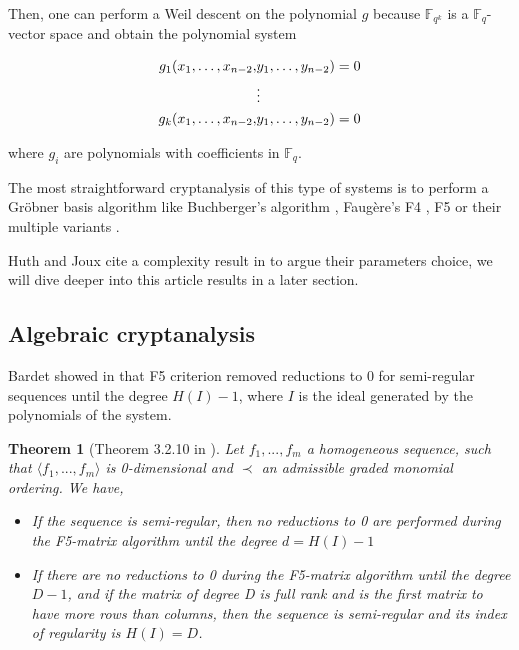 \documentclass[english]{article}
\newtheorem{theorem}{Theorem}[section]
\begin{document}
		Then, one can perform a Weil descent on the polynomial $g$ because $\mathbb{F}_{q^k}$ is a $\mathbb{F}_q$-vector space and obtain the polynomial system
		
		
		\begin{align}
			g_1(x_1, \dots, x_{n-2},& y_1, \dots, y_{n-2}) = 0 \notag \\
			&\vdots \notag \\
			g_k(x_1, \dots, x_{n-2},& y_1, \dots, y_{n-2}) = 0 \notag
		\end{align}
		
		where $g_i$ are polynomials with coefficients in $\mathbb{F}_q$.
		
		The most straightforward cryptanalysis of this type of systems is to perform a Gröbner basis algorithm like Buchberger's algorithm \cite{Buc}, Faugère's F4 \cite{F99}, F5 \cite{F02} or their multiple variants \cite{EF19}.
		
		Huth and Joux cite a complexity result in \cite{FSS11} to argue their parameters choice, we will dive deeper into this article  results in a later section.
		
		\subsection{Algebraic cryptanalysis}
		
		Bardet showed in \cite{Bardet04} that F5 criterion removed reductions to 0 for semi-regular sequences until the degree $H(I) - 1$, where $I$ is the ideal generated by the polynomials of the system.
		
		\begin{theorem}[Theorem 3.2.10 in \cite{Bardet04}]
			Let $f_1,...,f_m$ a homogeneous sequence, such that $\langle f_1,...,f_m \rangle$ is 0-dimensional and
			$\prec$ an admissible graded monomial ordering. We have,
			\begin{itemize}
				\item[-] If the sequence is semi-regular, then no reductions to 0 are performed during the F5-matrix algorithm until the degree $d = H(I) - 1$
				\item[-] If there are no reductions to 0 during the F5-matrix algorithm until the degree $D - 1$, and if the matrix of degree D is full rank and is the first matrix to have more rows than columns, then the sequence is semi-regular and its index of regularity is $H(I) = D$.
			\end{itemize}
		\end{theorem}
		
\end{document}
